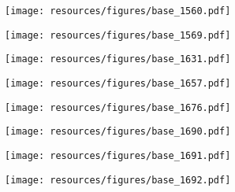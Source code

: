 \begin{figure}[h]
\centering
\begin{minipage}{0.49\textwidth}
  \centering
  \texttt{[image: resources/figures/base\_1560.pdf]}
  \label{fig:appendix_base_1560}
\end{minipage}
\begin{minipage}{0.49\textwidth}
  \centering
  \texttt{[image: resources/figures/base\_1569.pdf]}
  \label{fig:appendix_base_1569}
\end{minipage}
\end{figure}
\begin{figure}[h]
\centering
\begin{minipage}{0.49\textwidth}
  \centering
  \texttt{[image: resources/figures/base\_1631.pdf]}
  \label{fig:appendix_base_1631}
\end{minipage}
\begin{minipage}{0.49\textwidth}
  \centering
  \texttt{[image: resources/figures/base\_1657.pdf]}
  \label{fig:appendix_base_1657}
\end{minipage}
\end{figure}
\begin{figure}[h]
\centering
\begin{minipage}{0.49\textwidth}
  \centering
  \texttt{[image: resources/figures/base\_1676.pdf]}
  \label{fig:appendix_base_1676}
\end{minipage}
\begin{minipage}{0.49\textwidth}
  \centering
  \texttt{[image: resources/figures/base\_1690.pdf]}
  \label{fig:appendix_base_1690}
\end{minipage}
\end{figure}
\begin{figure}[h]
\centering
\begin{minipage}{0.49\textwidth}
  \centering
  \texttt{[image: resources/figures/base\_1691.pdf]}
  \label{fig:appendix_base_1691}
\end{minipage}
\begin{minipage}{0.49\textwidth}
  \centering
  \texttt{[image: resources/figures/base\_1692.pdf]}
  \label{fig:appendix_base_1692}
\end{minipage}
\end{figure}
